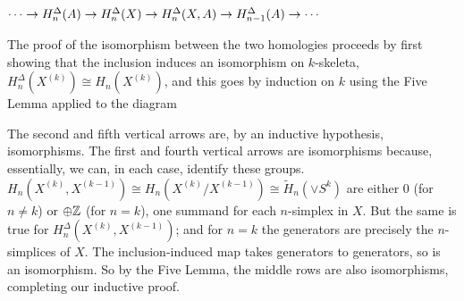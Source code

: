 \ssk

$\cdots \rightarrow H_n^\Delta(A) \rightarrow H_n^\Delta(X) \rightarrow H_n^\Delta(X,A) \rightarrow H_{n-1}^\Delta(A) \rightarrow \cdots$

\ssk

The proof of the isomorphism between the two homologies proceeds by first showing that the
inclusion induces an isomorphism on $k$-skeleta, $H_n^\Delta(X^{(k)})\cong H_n(X^{(k)})$,
and this goes by induction on $k$ using the Five Lemma applied to the diagram

\ssk


\ssk

The second and fifth vertical arrows are, by an inductive hypothesis, isomorphisms. The first and fourth vertical arrows are
isomorphisms because, essentially, we can, in each case, identify these groups. 
$H_{n}(X^{(k)},X^{(k-1)})\cong H_{n}(X^{(k)}/X^{(k-1)})\cong \widetilde{H}_n(\vee S^k)$
are either 0 (for $n\neq k$) or $\oplus {\Bbb Z}$ (for $n=k$), one summand for each $n$-simplex in $X$. 
But the same is true for $H_{n}^\Delta(X^{(k)},X^{(k-1)})$; and for $n=k$ the generators are precisely
the $n$-simplices of $X$. The inclusion-induced map takes generators to generators, so is an isomorphism.
\hhsk So by the Five Lemma, the middle rows are also isomorphisms, completing our inductive proof.

\ssk

